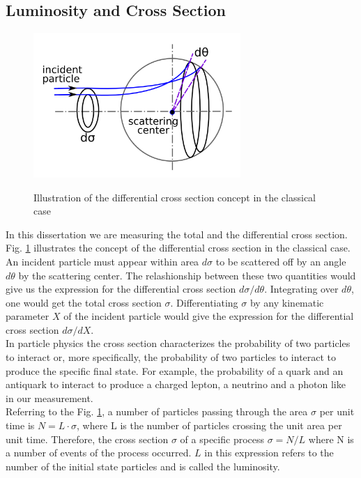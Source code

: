 \subsection{Luminosity and Cross Section}




\begin{figure}[htb]
  \begin{center}
    {\includegraphics[width=0.70\textwidth]{../figs/WgAbout/CSclassical.png}}
    \caption{Illustration of the differential cross section concept in the classical case}
    \label{fig:CSclassical}
  \end{center}
\end{figure}

In this dissertation we are measuring the total and the differential cross section. Fig. \ref{fig:CSclassical} illustrates the concept of the differential cross section in the classical case. An incident particle must appear within area $d\sigma$ to be scattered off by an angle $d\theta$ by the scattering center. The relashionship between these two quantities would give us the expression for the differential cross section $d\sigma/d\theta$. Integrating over $d\theta$, one would get the total cross section $\sigma$. Differentiating $\sigma$ by any kinematic parameter $X$ of the incident particle would give the expression for the differential cross section $d\sigma/dX$.\\

In particle physics the cross section characterizes the probability of two particles to interact or, more specifically, the probability of two particles to interact to produce the specific final state. For example, the probability of a quark and an antiquark to interact to produce a charged lepton, a neutrino and a photon like in our measurement.\\

Referring to the Fig. \ref{fig:CSclassical}, a number of particles passing through the area $\sigma$ per unit time is $N=L \cdot \sigma$, where L is the number of particles crossing the unit area per unit time. Therefore, the cross section $\sigma$ of a specific process $\sigma=N/L$ where N is a number of events of the process occurred. $L$ in this expression refers to the number of the initial state particles and is called the luminosity. \\
  
